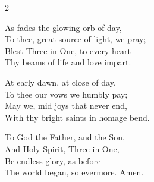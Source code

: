 \begin{multicols}{2}
\raggedcolumns
\begin{enpars}
As fades the glowing orb of day,\\
To thee, great source of light, we pray;\\
Blest Three in One, to every heart\\
Thy beams of life and love impart.

At early dawn, at close of day,\\
To thee our vows we humbly pay;\\
May we, mid joys that never end,\\
With thy bright saints in homage bend.

To God the Father, and the Son,\\
And Holy Spirit, Three in One,\\
Be endless glory, as before\\
The world began, so evermore. Amen.

\end{enpars}
\end{multicols}